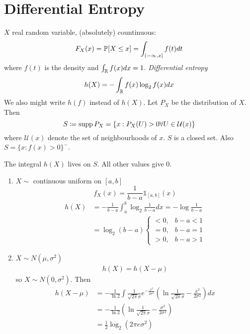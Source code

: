 \documentclass[mfit.tex]{subfiles}
\begin{document}
\section{Differential Entropy}

\begin{defi*}
  $X$ real random variable, (absolutely) countinuous:
  \[ F_X(x) = \operatorname{\mathbb{P}}[X \leq x] = \int_{(-\infty,x]} f(t) dt \]
  where $f(t)$ is the density and $\int_{\mathbb{R}} f(x) dx = 1$.
  \emph{Differential entropy}
  \[ h(X) = - \int_{\mathbb{R}} f(x) \log_2 f(x) dx \]
  We also might write $h(f)$ instead of $h(X)$.
  Let $P_X$ be the distribution of $X$.
  Then 
  \[ S \coloneqq \operatorname{supp} P_X = \{x: P_X(U) > 0 \forall U \in \mathcal{U}(x) \} \]
  where $\mathcal{U}(x)$ denote the set of neighbourhoods of $x$.
  $S$ is a closed set. Also $S = \{ x: f(x) >0 \}^-$.
\end{defi*}

The integral $h(X)$ lives on $S$. All other values give $0$.

\begin{ex}
  \begin{enumerate}
    \item $X \sim $ continuous uniform on $[a,b]$
    \[ f_X(x) = \frac{1}{b-a} \mathbb{1}_{[a,b]}(x) \]
    \begin{align*}
      h(X) &= - \frac{1}{b-a} \int_a^b \log_2 \frac{1}{b-a} dx = - \log \frac{1}{b-a} \\
      &= \log_2(b-a) \begin{cases} < 0, & b-a < 1 \\ = 0, & b-a = 1 \\ > 0, & b-a > 1 \end{cases}
    \end{align*}
    \item $X \sim N(\mu,\sigma^2)$
    \begin{align*}
      h(X) = h(X - \mu)
    \end{align*}
    so $X \sim N(0,\sigma^2)$.
    Then
    \begin{align*}
      h(X- \mu) &= - \frac{1}{\ln 2}\int \frac{1}{\sqrt{2 \pi} \sigma} e^{- \frac{x^2}{2 \sigma^2}} (\ln \frac{1}{\sqrt{2 \pi} \sigma} - \frac{x^2}{2 \sigma^2}) dx \\
      &= - \frac{1}{\ln 2} (\ln \frac{1}{\sqrt{2 \pi} \sigma} - \frac{\sigma^2}{2\sigma^2}) \\
      &= \frac{1}{2} \log_2 (2 \pi e \sigma^2)
    \end{align*}
  \end{enumerate}
\end{ex}
\end{document}
